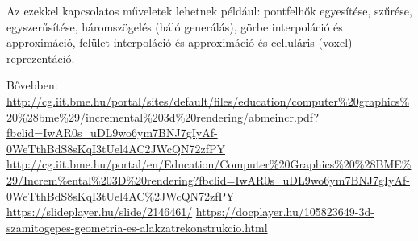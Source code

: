 \documentclass[12pt]{article}
\theoremstyle{plain}
\begin{document}
Az ezekkel kapcsolatos műveletek lehetnek például: pontfelhők egyesítése, szűrése, egyszerűsítése, háromszögelés (háló generálás), görbe interpoláció és approximáció, felület interpoláció és approximáció és celluláris (voxel) reprezentáció.

Bővebben:
\url{http://cg.iit.bme.hu/portal/sites/default/files/education/computer%20graphics%20%28bme%29/incremental%203d%20rendering/abmeincr.pdf?fbclid=IwAR0s_uDL9wo6ym7BNJ7gIyAf-0WeTthBdS8sKqI3tUel4AC2JWcQN72zfPY}
\url{http://cg.iit.bme.hu/portal/en/Education/Computer%20Graphics%20%28BME%29/Increm%ental%203D%20rendering?fbclid=IwAR0s_uDL9wo6ym7BNJ7gIyAf-0WeTthBdS8sKqI3tUel4AC%2JWcQN72zfPY}
\url{https://slideplayer.hu/slide/2146461/} 
\url{https://docplayer.hu/105823649-3d-szamitogepes-geometria-es-alakzatrekonstrukcio.html}
\end{document}
